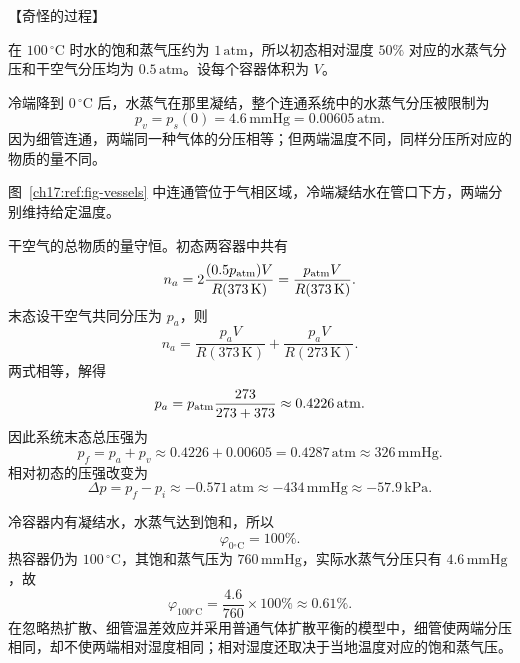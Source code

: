 {\begin{origexamplebox}{【奇怪的过程】}
\ThQTwoVessels
\end{origexamplebox}

\begin{xesolution}
在 $100\,{}^{\circ}\mathrm C$ 时水的饱和蒸气压约为 $1\,\mathrm{atm}$，所以初态相对湿度 $50\%$
对应的水蒸气分压和干空气分压均为 $0.5\,\mathrm{atm}$。设每个容器体积为 $V$。

冷端降到 $0\,{}^{\circ}\mathrm C$ 后，水蒸气在那里凝结，整个连通系统中的水蒸气分压被限制为
\[
  p_v=p_s(0)=4.6\,\mathrm{mmHg}=0.00605\,\mathrm{atm}.
\]
因为细管连通，两端同一种气体的分压相等；但两端温度不同，同样分压所对应的物质的量不同。

\par\noindent\begin{minipage}{\linewidth}
\twoVesselsFigure
{}\label{ch17:ref:fig-vessels}
\end{minipage}\par\medskip
图~\ref{ch17:ref:fig-vessels} 中连通管位于气相区域，冷端凝结水在管口下方，两端分别维持给定温度。

干空气的总物质的量守恒。初态两容器中共有
\[
  n_a=2\frac{(0.5p_{\rm atm})V}{R(373\,\mathrm K)}
  =\frac{p_{\rm atm}V}{R(373\,\mathrm K)}.
\]
末态设干空气共同分压为 $p_a$，则
\[
  n_a=\frac{p_aV}{R(373\,\mathrm K)}
      +\frac{p_aV}{R(273\,\mathrm K)}.
\]
两式相等，解得
\[
  p_a=p_{\rm atm}\frac{273}{273+373}
  \approx0.4226\,\mathrm{atm}.
\]
因此系统末态总压强为
\[
  p_f=p_a+p_v\approx0.4226+0.00605=0.4287\,\mathrm{atm}
  \approx326\,\mathrm{mmHg}.
\]
相对初态的压强改变为
\[
  \boxed{\Delta p=p_f-p_i\approx-0.571\,\mathrm{atm}
  \approx-434\,\mathrm{mmHg}\approx-57.9\,\mathrm{kPa}}.
\]

冷容器内有凝结水，水蒸气达到饱和，所以
\[
  \boxed{\varphi_{0{}^\circ\mathrm C}=100\%}.
\]
热容器仍为 $100\,{}^{\circ}\mathrm C$，其饱和蒸气压为 $760\,\mathrm{mmHg}$，实际水蒸气分压只有
$4.6\,\mathrm{mmHg}$，故
\[
  \boxed{\varphi_{100{}^\circ\mathrm C}
  =\frac{4.6}{760}\times100\%\approx0.61\%}.
\]
在忽略热扩散、细管温差效应并采用普通气体扩散平衡的模型中，细管使两端分压相同，却不使两端相对湿度相同；相对湿度还取决于当地温度对应的饱和蒸气压。
\end{xesolution}

}
